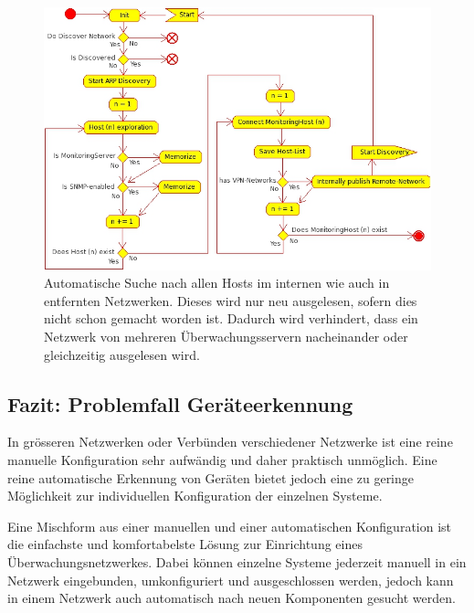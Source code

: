 \begin{figure}[ht]
  \centering
  \includegraphics[width=\linewidth]{images/theorie/AutoDiscovery}
  \caption[Ablauf zum Suchen von neuen Systemen in einem Netzwerk]{Automatische Suche nach allen Hosts im internen wie auch in entfernten Netzwerken. Dieses wird nur neu ausgelesen, sofern dies nicht schon gemacht worden ist. Dadurch wird verhindert, dass ein Netzwerk von mehreren \"Uberwachungsservern nacheinander oder gleichzeitig ausgelesen wird.}
  \label{fig:discovery-ablauf}
\end{figure}


\subsection{Fazit: Problemfall Ger\"ateerkennung} \label{sec:theorie-discovery-fazit}
In gr\"osseren Netzwerken oder Verb\"unden verschiedener Netzwerke ist eine reine manuelle Konfiguration sehr aufw\"andig und daher praktisch unm\"oglich. Eine reine automatische Erkennung von Ger\"aten bietet jedoch eine zu geringe M\"oglichkeit zur individuellen Konfiguration der einzelnen Systeme.

Eine Mischform aus einer manuellen und einer automatischen Konfiguration ist die einfachste und komfortabelste L\"osung zur Einrichtung eines \"Uberwachungsnetzwerkes. Dabei k\"onnen einzelne Systeme jederzeit manuell in ein Netzwerk eingebunden, umkonfiguriert und ausgeschlossen werden, jedoch kann in einem Netzwerk auch automatisch nach neuen Komponenten gesucht werden.

